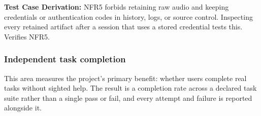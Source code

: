\documentclass[12pt, titlepage]{article}
\begin{document}
\begin{enumerate}
\textbf{Test Case Derivation:} NFR5 forbids retaining raw audio and keeping credentials or authentication codes in history, logs, or source control. Inspecting every retained artifact after a session that uses a stored credential tests this. Verifies NFR5.

\end{enumerate}

\subsubsection{Independent task completion}

This area measures the project's primary benefit: whether users complete real tasks without sighted help. The
result is a completion rate across a declared task suite rather than a single pass or fail, and every attempt and
failure is reported alongside it.
\end{document}

